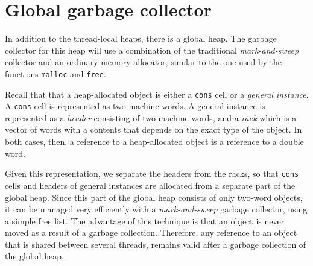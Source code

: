 \section{Global garbage collector}

In addition to the thread-local heaps, there is a global heap.  The
garbage collector for this heap will use a combination of the
traditional \emph{mark-and-sweep} collector and an ordinary memory
allocator, similar to the one used by the \clanguage{} functions
\texttt{malloc} and \texttt{free}.

Recall that that a heap-allocated object is either a \texttt{cons}
cell or a \emph{general instance}.  A \texttt{cons} cell is
represented as two machine words.  A general instance is represented
as a \emph{header} consisting of two machine words, and a \emph{rack}
which is a vector of words with a contents that depends on the exact
type of the object.  In both cases, then, a reference to a
heap-allocated object is a reference to a double word.

Given this representation, we separate the headers from the racks, so
that \texttt{cons} cells and headers of general instances are
allocated from a separate part of the global heap.  Since this part of
the global heap consists of only two-word objects, it can be managed
very efficiently with a \emph{mark-and-sweep} garbage collector, using
a simple free list.  The advantage of this technique is that an object
is never moved as a result of a garbage collection.  Therefore, any
reference to an object that is shared between several threads, remains
valid after a garbage collection of the global heap.

